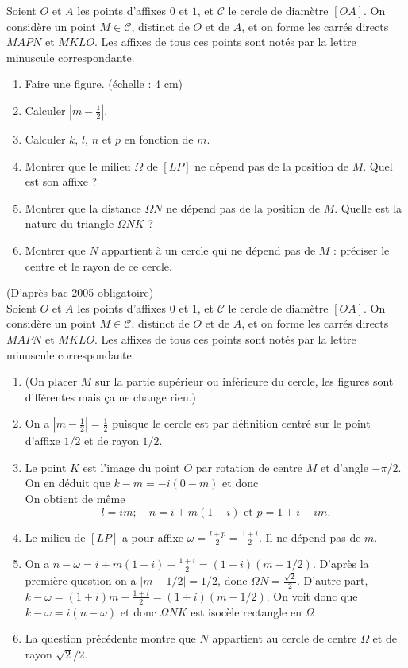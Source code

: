 \begin{exo}
Soient $O$ et $A$ les points d'affixes $0$ et $1$, et $\mathcal C$ le cercle de diamètre $[OA]$. On considère un point $M\in\mathcal C$, distinct de $O$ et de $A$, et on forme les carrés directs $MAPN$ et $MKLO$. Les affixes de tous ces points sont notés par la lettre minuscule correspondante.
\begin{enumerate}
\item Faire une figure. (échelle : 4 cm)
\item Calculer $\left\lvert m-\frac12\right\rvert$.
\item Calculer $k$, $l$, $n$ et $p$ en fonction de $m$.
\item Montrer que le milieu $\Omega$ de $[LP]$ ne dépend pas de la position de $M$. Quel est son affixe ?
\item Montrer que la distance $\Omega N$ ne dépend pas de la position de $M$. Quelle est la nature du triangle $\Omega NK$ ?
\item Montrer que $N$ appartient à un cercle qui ne dépend pas de $M$ : préciser le centre et le rayon de ce cercle.
\end{enumerate}

\begin{sol}
(D'après bac 2005 obligatoire)\\
Soient $O$ et $A$ les points d'affixes $0$ et $1$, et $\mathcal C$ le cercle de diamètre $[OA]$. On considère un point $M\in\mathcal C$, distinct de $O$ et de $A$, et on forme les carrés directs $MAPN$ et $MKLO$. Les affixes de tous ces points sont notés par la lettre minuscule correspondante.
\begin{enumerate}
\item (On placer $M$ sur la partie supérieur ou inférieure du cercle, les figures sont différentes mais ça ne change rien.)
\item On a $\left\lvert m-\frac12\right\rvert=\frac12$ puisque le cercle est par définition centré sur le point d'affixe $1/2$ et de rayon $1/2$.
\item Le point $K$ est l'image du point $O$ par rotation de centre $M$ et d'angle $-\pi/2$. On en déduit que $k-m=-i(0-m)$ et donc \\
On obtient de même
\[ l=im;\quad n=i+m(1-i)\text{ et }p=1+i-im.\]
\item Le milieu de $[LP]$ a pour affixe $\omega=\frac{l+p}{2}=\frac{1+i}{2}$. Il ne dépend pas de $m$.
\item On a $n-\omega = i+m(1-i)-\frac{1+i}{2}= (1-i)(m-1/2)$. D'après la première question on a $|m-1/2|=1/2$, donc $\Omega N = \frac{\sqrt 2}{2}$. 
D'autre part, $k-\omega = (1+i)m-\frac{1+i}{2} = (1+i)(m-1/2)$. On voit donc que $k-\omega=i(n-\omega)$ et donc $\Omega NK$ est isocèle rectangle en $\Omega$ 
\item La question précédente montre que $N$ appartient au cercle de centre $\Omega$ et de rayon $\sqrt 2/2$.
\end{enumerate}
\end{sol}
\end{exo}




